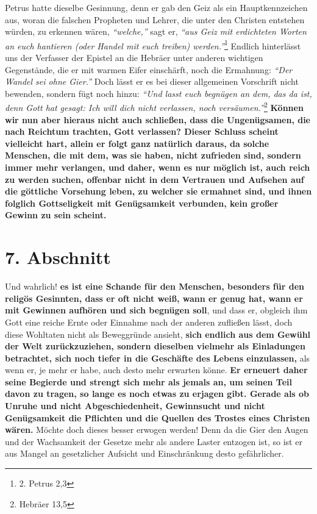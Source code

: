 Petrus  hatte dieselbe Gesinnung, denn er gab den Geiz
als ein Hauptkennzeichen
aus, woran die falschen Propheten und Lehrer,
die unter den Christen entstehen
würden, zu erkennen wären, \textit{"`welche,"'} sagt er, \textit{"`aus Geiz mit
erdichteten
Worten an euch hantieren (oder Handel mit euch treiben) werden."'}\footnote{2. Petrus 2,3}
Endlich hinterlässt uns der Verfasser der Epistel an die Hebräer
unter anderen wichtigen Gegenstände, die er mit warmen Eifer einschärft, noch die
Ermahnung: \textit{"`Der Wandel sei ohne Gier."'} Doch lässt er es bei dieser
allgemeinen
Vorschrift nicht bewenden, sondern fügt noch hinzu:
\textit{"`Und lasst euch begnügen an
dem, das da ist, denn Gott hat gesagt: Ich will dich nicht verlassen, noch
versäumen."'}\footnote{Hebräer 13,5}
 \label{ref:13_06_reichtum_unersaettlichkeit}
\textbf{Können wir nun aber hieraus nicht auch
schließen, dass die Ungenügsamen, die nach
Reichtum trachten, Gott verlassen?
Dieser Schluss scheint vielleicht hart, allein er folgt ganz natürlich daraus, da
solche Menschen, die mit dem, was sie haben, nicht zufrieden sind, sondern immer
mehr verlangen, und daher, wenn es nur möglich ist, auch reich zu werden suchen,
offenbar nicht in dem Vertrauen und Aufsehen auf die göttliche Vorsehung leben,
zu welcher sie ermahnet sind, und ihnen folglich Gottseligkeit mit Genügsamkeit
verbunden, kein großer Gewinn zu sein scheint.}

\section{7. Abschnitt} \label{kap13_ab7}

  Und wahrlich! \textbf{es ist eine
Schande für den Menschen, besonders für den
religös Gesinnten, dass er oft nicht weiß, wann er genug hat, wann er mit Gewinnen
aufhören und sich begnügen soll}, und dass er, obgleich ihm Gott eine reiche
Ernte
oder Einnahme nach der anderen zufließen lässt, doch diese Wohltaten nicht als
Beweggründe ansieht, \label{ref:13_07_reichtum_genuegsamkeit}
\textbf{sich endlich aus dem Gewühl der Welt zurückzuziehen,
sondern dieselben vielmehr als Einladungen betrachtet, sich noch tiefer in die
Geschäfte des Lebens einzulassen,} als wenn er, je mehr er habe, auch desto mehr
erwarten könne. \textbf{Er erneuert daher seine Begierde und strengt sich mehr
als
jemals an, um seinen Teil davon zu tragen, so lange es noch etwas zu erjagen
gibt. Gerade als ob Unruhe und nicht Abgeschiedenheit,
Gewinnsucht und nicht
Genügsamkeit die Pflichten und die Quellen des
Trostes eines Christen wären.}
Möchte doch dieses besser erwogen werden! Denn da die Gier den Augen und der
Wachsamkeit der Gesetze mehr als andere Laster entzogen ist, so ist er aus
 Mangel an gesetzlicher Aufsicht und
Einschränkung desto gefährlicher.

